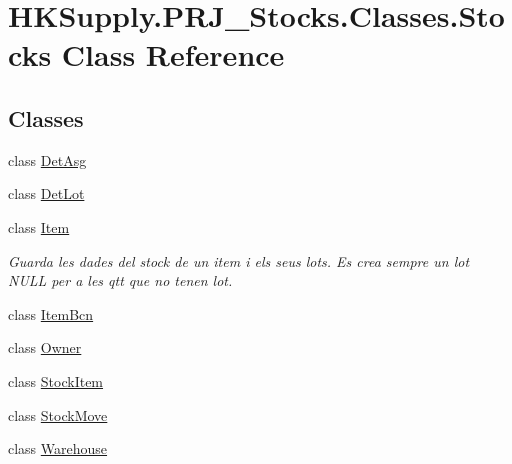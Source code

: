 \hypertarget{class_h_k_supply_1_1_p_r_j___stocks_1_1_classes_1_1_stocks}{}\section{H\+K\+Supply.\+P\+R\+J\+\_\+\+Stocks.\+Classes.\+Stocks Class Reference}
\label{class_h_k_supply_1_1_p_r_j___stocks_1_1_classes_1_1_stocks}
\subsection*{Classes}
\begin{DoxyCompactItemize}
\item 
class \mbox{\hyperlink{class_h_k_supply_1_1_p_r_j___stocks_1_1_classes_1_1_stocks_1_1_det_asg}{Det\+Asg}}
\item 
class \mbox{\hyperlink{class_h_k_supply_1_1_p_r_j___stocks_1_1_classes_1_1_stocks_1_1_det_lot}{Det\+Lot}}
\item 
class \mbox{\hyperlink{class_h_k_supply_1_1_p_r_j___stocks_1_1_classes_1_1_stocks_1_1_item}{Item}}
\begin{DoxyCompactList}\small\item\em Guarda les dades del stock de un item i els seus lots. Es crea sempre un lot N\+U\+LL per a les qtt que no tenen lot. \end{DoxyCompactList}\item 
class \mbox{\hyperlink{class_h_k_supply_1_1_p_r_j___stocks_1_1_classes_1_1_stocks_1_1_item_bcn}{Item\+Bcn}}
\item 
class \mbox{\hyperlink{class_h_k_supply_1_1_p_r_j___stocks_1_1_classes_1_1_stocks_1_1_owner}{Owner}}
\item 
class \mbox{\hyperlink{class_h_k_supply_1_1_p_r_j___stocks_1_1_classes_1_1_stocks_1_1_stock_item}{Stock\+Item}}
\item 
class \mbox{\hyperlink{class_h_k_supply_1_1_p_r_j___stocks_1_1_classes_1_1_stocks_1_1_stock_move}{Stock\+Move}}
\item 
class \mbox{\hyperlink{class_h_k_supply_1_1_p_r_j___stocks_1_1_classes_1_1_stocks_1_1_warehouse}{Warehouse}}
\end{DoxyCompactItemize}
